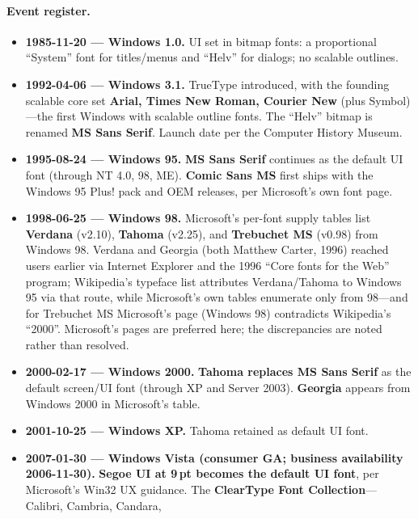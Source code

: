 \documentclass[10pt,a4paper]{article}
\begin{document}
\paragraph{Event register.}
\begin{itemize}[leftmargin=1.2em,itemsep=2pt]
\item \textbf{1985-11-20 --- Windows 1.0.} UI set in bitmap fonts: a proportional
``System'' font for titles/menus and ``Helv'' for dialogs; no scalable
outlines.\cite{w-mssans}
\item \textbf{1992-04-06 --- Windows 3.1.} TrueType introduced, with the founding
scalable core set \textbf{Arial, Times New Roman, Courier New} (plus Symbol)---the
first Windows with scalable outline fonts. The ``Helv'' bitmap is renamed \textbf{MS
Sans Serif}. Launch date per the Computer History
Museum.\cite{w-31date,w-ttf,w-mssans}
\item \textbf{1995-08-24 --- Windows 95.} \textbf{MS Sans Serif} continues as the
default UI font (through NT 4.0, 98, ME). \textbf{Comic Sans MS} first ships with the
Windows 95 Plus! pack and OEM releases, per Microsoft's own font
page.\cite{w-95date,w-mssans,w-comic}
\item \textbf{1998-06-25 --- Windows 98.} Microsoft's per-font supply tables list
\textbf{Verdana} (v2.10), \textbf{Tahoma} (v2.25), and \textbf{Trebuchet MS} (v0.98)
from Windows 98. Verdana and Georgia (both Matthew Carter, 1996) reached users
earlier via Internet Explorer and the 1996 ``Core fonts for the Web'' program;
Wikipedia's typeface list attributes Verdana/Tahoma to Windows 95 via that route,
while Microsoft's own tables enumerate only from 98---and for Trebuchet MS
Microsoft's page (Windows 98) contradicts Wikipedia's ``2000''. Microsoft's pages are
preferred here; the discrepancies are noted rather than
resolved.\cite{w-98date,w-verdana,w-tahoma,w-trebuchet,w-corefonts,w-typelist}
\item \textbf{2000-02-17 --- Windows 2000.} \textbf{Tahoma replaces MS Sans Serif} as
the default screen/UI font (through XP and Server 2003). \textbf{Georgia} appears
from Windows 2000 in Microsoft's table.\cite{w-2000date,w-tahoma-default,w-georgia}
\item \textbf{2001-10-25 --- Windows XP.} Tahoma retained as default UI
font.\cite{w-xpdate,w-tahoma-default}
\item \textbf{2007-01-30 --- Windows Vista (consumer GA; business availability
2006-11-30).} \textbf{Segoe UI at 9\,pt becomes the default UI font}, per Microsoft's
Win32 UX guidance. The \textbf{ClearType Font Collection}---Calibri, Cambria, Candara,

\end{itemize}
\end{document}
